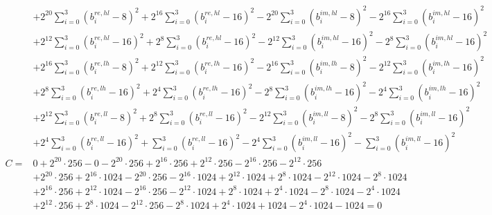 \documentclass[fleqn]{article}
\begin{document}
{\[{\begin{aligned}
  & + 2^{20}\!\sum_{i=0}^{3}(b_i^{re,hl}{-}8)^2 + 2^{16}\!\sum_{i=0}^{3}(b_i^{re,hl}{-}16)^2 - 2^{20}\!\sum_{i=0}^{3}(b_i^{im,hl}{-}8)^2 - 2^{16}\!\sum_{i=0}^{3}(b_i^{im,hl}{-}16)^2 \\
  & + 2^{12}\!\sum_{i=0}^{3}(b_i^{re,hl}{-}16)^2 + 2^{8}\!\sum_{i=0}^{3}(b_i^{re,hl}{-}16)^2 - 2^{12}\!\sum_{i=0}^{3}(b_i^{im,hl}{-}16)^2 - 2^{8}\!\sum_{i=0}^{3}(b_i^{im,hl}{-}16)^2 \\
  & + 2^{16}\!\sum_{i=0}^{3}(b_i^{re,lh}{-}8)^2 + 2^{12}\!\sum_{i=0}^{3}(b_i^{re,lh}{-}16)^2 - 2^{16}\!\sum_{i=0}^{3}(b_i^{im,lh}{-}8)^2 - 2^{12}\!\sum_{i=0}^{3}(b_i^{im,lh}{-}16)^2 \\
  & + 2^{8}\!\sum_{i=0}^{3}(b_i^{re,lh}{-}16)^2 + 2^{4}\!\sum_{i=0}^{3}(b_i^{re,lh}{-}16)^2 - 2^{8}\!\sum_{i=0}^{3}(b_i^{im,lh}{-}16)^2 - 2^{4}\!\sum_{i=0}^{3}(b_i^{im,lh}{-}16)^2 \\
  & + 2^{12}\!\sum_{i=0}^{3}(b_i^{re,ll}{-}8)^2 + 2^{8}\!\sum_{i=0}^{3}(b_i^{re,ll}{-}16)^2 - 2^{12}\!\sum_{i=0}^{3}(b_i^{im,ll}{-}8)^2 - 2^{8}\!\sum_{i=0}^{3}(b_i^{im,ll}{-}16)^2 \\
  & + 2^{4}\!\sum_{i=0}^{3}(b_i^{re,ll}{-}16)^2 + \sum_{i=0}^{3}(b_i^{re,ll}{-}16)^2 - 2^{4}\!\sum_{i=0}^{3}(b_i^{im,ll}{-}16)^2 - \sum_{i=0}^{3}(b_i^{im,ll}{-}16)^2 \\[0.35em]
C ={}& 0 + 2^{20}\!\cdot\!256 - 0 - 2^{20}\!\cdot\!256 + 2^{16}\!\cdot\!256 + 2^{12}\!\cdot\!256 - 2^{16}\!\cdot\!256 - 2^{12}\!\cdot\!256 \\
  & + 2^{20}\!\cdot\!256 + 2^{16}\!\cdot\!1024 - 2^{20}\!\cdot\!256 - 2^{16}\!\cdot\!1024 + 2^{12}\!\cdot\!1024 + 2^{8}\!\cdot\!1024 - 2^{12}\!\cdot\!1024 - 2^{8}\!\cdot\!1024 \\
  & + 2^{16}\!\cdot\!256 + 2^{12}\!\cdot\!1024 - 2^{16}\!\cdot\!256 - 2^{12}\!\cdot\!1024 + 2^{8}\!\cdot\!1024 + 2^{4}\!\cdot\!1024 - 2^{8}\!\cdot\!1024 - 2^{4}\!\cdot\!1024 \\
  & + 2^{12}\!\cdot\!256 + 2^{8}\!\cdot\!1024 - 2^{12}\!\cdot\!256 - 2^{8}\!\cdot\!1024 + 2^{4}\!\cdot\!1024 + 1024 - 2^{4}\!\cdot\!1024 - 1024 = 0
\end{aligned}
\;}
\]
}

\medskip
\end{document}
